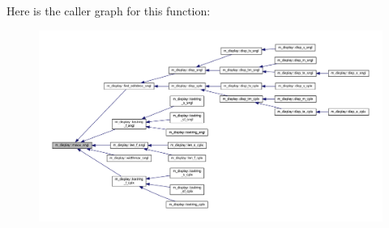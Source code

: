 Here is the caller graph for this function\+:
\nopagebreak
\begin{figure}[H]
\begin{center}
\leavevmode
\includegraphics[width=350pt]{namespacem__display_a7d542f36f022c67f2879318796f82e57_icgraph}
\end{center}
\end{figure}
\mbox{\label{namespacem__display_ac4ed462092efa64e5ce8454e7a752d10}} 
